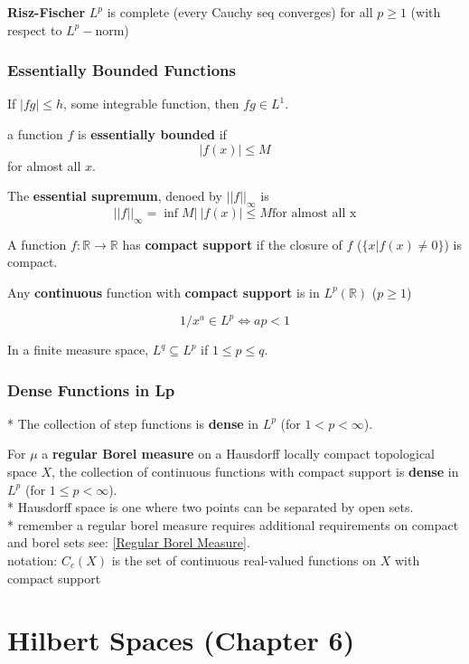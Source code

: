 \documentclass[a4paper, 12pt]{article}
\def\R{\ensuremath{\mathbb{R}}} %
\newcommand{\bt}[1]{\textbf{#1}} %
\begin{document}
\begin{multicols}{2}
\bt{Risz-Fischer} $L^p$ is complete (every Cauchy seq converges) for all $p \geq 1$ (with respect to $L^p-$norm)

\subsubsection{Essentially Bounded Functions}

If $|fg| \leq h$, some integrable function, then $fg \in L^1$.

a function $f$ is \bt{essentially bounded} if 
$$| f(x) | \leq M$$ 
for almost all $x$.

The \bt{essential supremum}, denoed by $||f||_\infty$ is 
$$||f||_\infty = \inf{M |\ |f(x)| \leq M \text{for almost all x}}$$

A function $f: \R \rightarrow \R$ has \bt{compact support} if 
the closure of $f$ ($\{x | f(x) \neq 0\}$) is compact.

Any \bt{continuous} function with \bt{compact support} is in $L^p(\R)$ 
($p \geq 1$)

$$1/x^a \in L^p \iff ap < 1$$

In a finite measure space, $L^q \subseteq L^p$ if $1 \leq p \leq q$.

\subsubsection{Dense Functions in Lp}

* The collection of step functions is \bt{dense} in $L^p$ (for $1 < p < \infty$).

For $\mu$ a \bt{regular Borel measure} on a Hausdorff locally compact topological space $X$, 
the collection of continuous functions with compact support is \bt{dense} in $L^p$ 
(for $1 \leq p < \infty$).\\

* Hausdorff space is one where two points can be separated by open sets. \\
* remember a regular borel measure requires additional requirements on compact and borel sets 
see: \ref{Regular Borel Measure}. \\

notation: $C_c(X)$ is the set of continuous real-valued functions on $X$ with 
compact support

\section{Hilbert Spaces (Chapter 6)}


\end{multicols}
\end{document}
